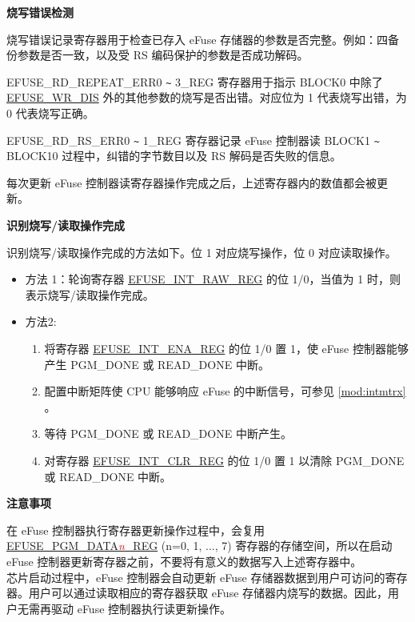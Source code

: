 \documentclass[main\_\_CN.tex]{subfiles}
\begin{document}
{\bfseries 烧写错误检测}

烧写错误记录寄存器用于检查已存入 eFuse 存储器的参数是否完整。例如：四备份参数是否一致，以及受 RS 编码保护的参数是否成功解码。

EFUSE\_RD\_REPEAT\_ERR0 \verb+~+ 3\_REG 寄存器用于指示 BLOCK0 中除了 \hyperref[fielddesc:EFUSEWRDIS]{EFUSE\_WR\_DIS} 外的其他参数的烧写是否出错。对应位为 1 代表烧写出错，为 0 代表烧写正确。

EFUSE\_RD\_RS\_ERR0 \verb+~+ 1\_REG 寄存器记录 eFuse 控制器读 BLOCK1 \verb+~+ BLOCK10 过程中，纠错的字节数目以及 RS 解码是否失败的信息。

每次更新 eFuse 控制器读寄存器操作完成之后，上述寄存器内的数值都会被更新。

{\bfseries 识别烧写/读取操作完成}

识别烧写/读取操作完成的方法如下。位 1 对应烧写操作，位 0 对应读取操作。
\begin{itemize}

    \item 方法 1：轮询寄存器 \hyperref[regdesc:EFUSEINTRAWREG]{EFUSE\_INT\_RAW\_REG} 的位 1/0，当值为 1 时，则表示烧写/读取操作完成。
    \item 方法2:
        \begin{enumerate}
            \item 将寄存器 \hyperref[regdesc:EFUSEINTENAREG]{EFUSE\_INT\_ENA\_REG} 的位 1/0 置 1，使 eFuse 控制器能够产生 PGM\_DONE 或 READ\_DONE 中断。
            \item 配置中断矩阵使 CPU 能够响应 eFuse 的中断信号，可参见 \ref{mod:intmtrx} \textit{}。
            
            \item 等待 PGM\_DONE 或 READ\_DONE 中断产生。
            
            \item 对寄存器 \hyperref[regdesc:EFUSEINTCLRREG]{EFUSE\_INT\_CLR\_REG} 的位 1/0 置 1 以清除 PGM\_DONE 或 READ\_DONE 中断。
    \end{enumerate}
\end{itemize}

{\bfseries 注意事项}

在 eFuse 控制器执行寄存器更新操作过程中，会复用 \hyperref[regdesc:EFUSEPGMDATANREG]{EFUSE\_PGM\_DATA\textcolor{red}{\it{n}}\_REG} (n=0, 1, ..., 7) 寄存器的存储空间，所以在启动 eFuse 控制器更新寄存器之前，不要将有意义的数据写入上述寄存器中。\\
芯片启动过程中，eFuse 控制器会自动更新 eFuse 存储器数据到用户可访问的寄存器。用户可以通过读取相应的寄存器获取 eFuse 存储器内烧写的数据。因此，用户无需再驱动 eFuse 控制器执行读更新操作。
\end{document}
